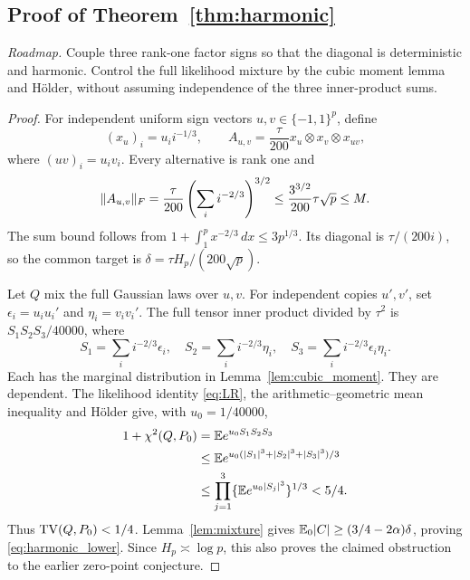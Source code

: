 \subsection{Proof of Theorem~\ref{thm:harmonic}}
\noindent\emph{Roadmap.} Couple three rank-one factor signs so that the diagonal is deterministic and harmonic. Control the full likelihood mixture by the cubic moment lemma and H\"older, without assuming independence of the three inner-product sums.
\begin{proof}
For independent uniform sign vectors $u,v\in\{-1,1\}^p$, define
\[
 (x_u)_i=u_i i^{-1/3},\qquad
 A_{u,v}=\frac{\tau}{200}x_u\otimes x_v\otimes x_{uv},
\]
where $(uv)_i=u_iv_i$. Every alternative is rank one and
\[
 \lVert A_{u,v}\rVert_F
 =\frac{\tau}{200}\left(\sum_i i^{-2/3}\right)^{3/2}
 \le\frac{3^{3/2}}{200}\tau\sqrt p\le M.
\]
The sum bound follows from
$1+\int_1^p x^{-2/3}\,dx\le3p^{1/3}$.
Its diagonal is $\tau/(200i)$, so the common target is
$\delta=\tau H_p/(200\sqrt p)$.

Let $Q$ mix the full Gaussian laws over $u,v$. For independent copies
$u',v'$, set $\epsilon_i=u_iu_i'$ and $\eta_i=v_iv_i'$.
The full tensor inner product divided by $\tau^2$ is
$S_1S_2S_3/40000$, where
\[
 S_1=\sum_i i^{-2/3}\epsilon_i,\quad
 S_2=\sum_i i^{-2/3}\eta_i,\quad
 S_3=\sum_i i^{-2/3}\epsilon_i\eta_i.
\]
Each has the marginal distribution in Lemma~\ref{lem:cubic_moment}.
They are dependent. The likelihood identity \eqref{eq:LR}, the arithmetic--geometric mean inequality and H\"older give, with $u_0=1/40000$,
\begin{align*}
 1+\chi^2(Q,P_0)
 &=\mathbb E e^{u_0S_1S_2S_3}\\
 &\le\mathbb E e^{u_0(|S_1|^3+|S_2|^3+|S_3|^3)/3}\\
 &\le\prod_{j=1}^3\{\mathbb E e^{u_0|S_j|^3}\}^{1/3}<5/4.
\end{align*}
Thus $\operatorname{TV}(Q,P_0)<1/4$. Lemma~\ref{lem:mixture} gives
$\mathbb E_0|C|\ge(3/4-2\alpha)\delta$, proving \eqref{eq:harmonic_lower}.
Since $H_p\asymp\log p$, this also proves the claimed obstruction to the earlier zero-point conjecture.
\end{proof}

